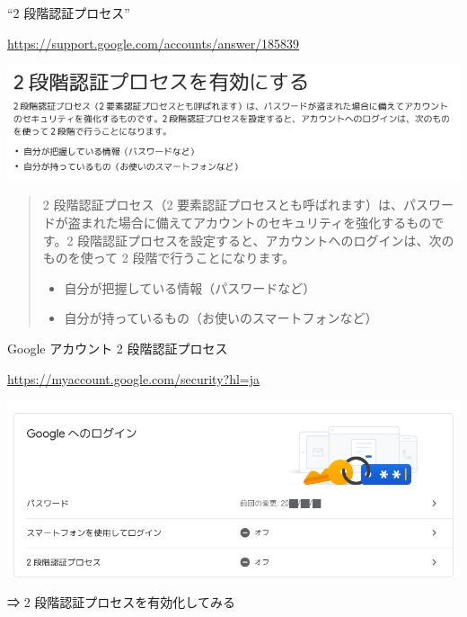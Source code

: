 \begin{frame}{``2 段階認証プロセス''}

{\footnotesize\url{https://support.google.com/accounts/answer/185839}}

\begin{center}
\includegraphics[width=0.9\hsize]{image202205/g-support-twostepverif.png}
\end{center}

\begin{quote}
2 段階認証プロセス（2 要素認証プロセスとも呼ばれます）は、パスワードが盗まれた場合に備えてアカウントのセキュリティを強化するものです。2 段階認証プロセスを設定すると、アカウントへのログインは、次のものを使って 2 段階で行うことになります。

\begin{itemize}
 \item     自分が把握している情報（パスワードなど）
 \item     自分が持っているもの（お使いのスマートフォンなど）
\end{itemize}
\end{quote}

\end{frame}

\begin{frame}{Google アカウント 2 段階認証プロセス}

{\footnotesize\url{https://myaccount.google.com/security?hl=ja}}

\begin{center}
\includegraphics[width=0.9\hsize]{image202205/g-security-signinopts-0.png}
\end{center}

\begin{quote}
\end{quote}

⇒ 2 段階認証プロセスを有効化してみる

\end{frame}


